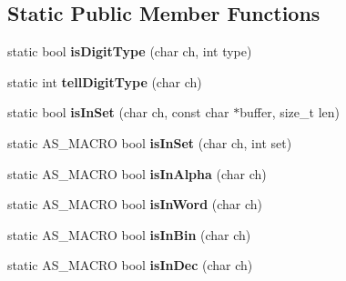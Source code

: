 \subsection*{Static Public Member Functions}
\begin{DoxyCompactItemize}
\item 
\mbox{\label{classx2_1_1_lexical_parser_af29705ffe052b5677961178322ec9805}} 
static bool {\bfseries is\+Digit\+Type} (char ch, int type)
\item 
\mbox{\label{classx2_1_1_lexical_parser_ab3be33ec664da5c1ec0eb0316b405be0}} 
static int {\bfseries tell\+Digit\+Type} (char ch)
\item 
\mbox{\label{classx2_1_1_lexical_parser_a3d83db1d9a2f0438f2f35a60bea4dac7}} 
static bool {\bfseries is\+In\+Set} (char ch, const char $\ast$buffer, size\+\_\+t len)
\item 
\mbox{\label{classx2_1_1_lexical_parser_a92a66e39a85bbabef3799ae21bc9fbcf}} 
static A\+S\+\_\+\+M\+A\+C\+RO bool {\bfseries is\+In\+Set} (char ch, int set)
\item 
\mbox{\label{classx2_1_1_lexical_parser_a05c3c1652ed12825a8b9da344abcb824}} 
static A\+S\+\_\+\+M\+A\+C\+RO bool {\bfseries is\+In\+Alpha} (char ch)
\item 
\mbox{\label{classx2_1_1_lexical_parser_a642ff181c1c56cccb7015c24a6941c60}} 
static A\+S\+\_\+\+M\+A\+C\+RO bool {\bfseries is\+In\+Word} (char ch)
\item 
\mbox{\label{classx2_1_1_lexical_parser_a5a8bb34203443bd5b3008f671da5fa98}} 
static A\+S\+\_\+\+M\+A\+C\+RO bool {\bfseries is\+In\+Bin} (char ch)
\item 
\mbox{\label{classx2_1_1_lexical_parser_ae53f57b10f1a677f4fe0244557c346f5}} 
static A\+S\+\_\+\+M\+A\+C\+RO bool {\bfseries is\+In\+Dec} (char ch)
\item 
\mbox{\label{classx2_1_1_lexical_parser_af15a122be3aae416676f721c5bc109f2}} 

\end{DoxyCompactItemize}
